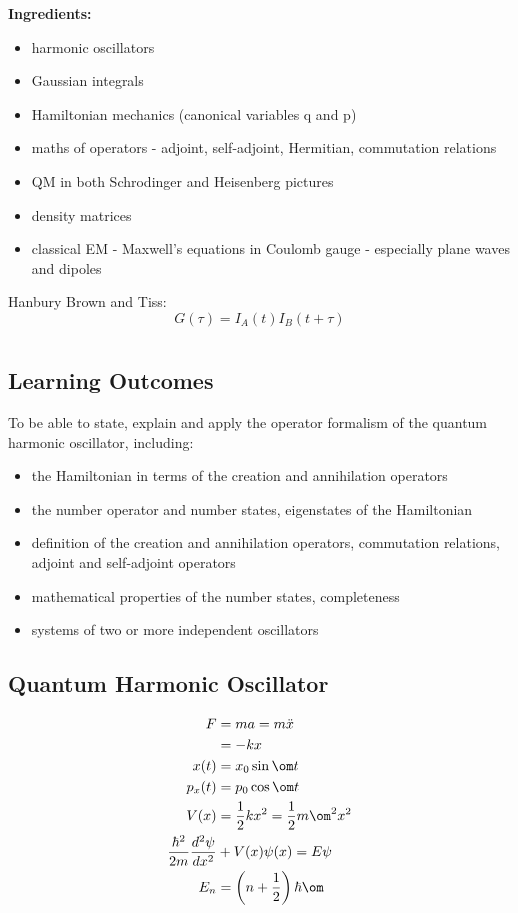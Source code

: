 \documentclass[a4paper, 11pt, normalem]{report}
\begin{document}
\textbf{Ingredients:}
\begin{itemize}
    \item harmonic oscillators
    \item Gaussian integrals
    \item Hamiltonian mechanics (canonical variables q and p)
    \item maths of operators - adjoint, self-adjoint, Hermitian, commutation relations
    \item QM in both Schrodinger and Heisenberg pictures
    \item density matrices
    \item classical EM - Maxwell's equations in Coulomb gauge - especially plane waves and dipoles
\end{itemize}

Hanbury Brown and Tiss:
\begin{equation}
    G(\tau) = I_A(t)I_B(t+\tau)
\end{equation}

\chapter{}
\section{Learning Outcomes}
To be able to state, explain and apply the operator formalism of the quantum harmonic oscillator, including:
\begin{itemize}
    \item the Hamiltonian in terms of the creation and annihilation operators
    \item the number operator and number states, eigenstates of the Hamiltonian
    \item definition of the creation and annihilation operators, commutation relations, adjoint and self-adjoint operators
    \item mathematical properties of the number states, completeness
    \item systems of two or more independent oscillators
\end{itemize}


\section{Quantum Harmonic Oscillator}
\begin{align}
    F &= ma = m\ddot{x} \\
      &= -kx \\
    x(t) &= x_0\sin\om t \\
    p_x(t) &= p_0\cos\om t \\
    V(x) &= \frac12 kx^2 = \frac12 m\om^2x^2 \\
    \frac{\hbar^2}{2m}\frac{d^2\psi}{dx^2} &+ V(x)\psi(x) = E\psi \\
    E_n &= \left(n+\frac12\right)\hbar\om
\end{align}
   
\end{document}
